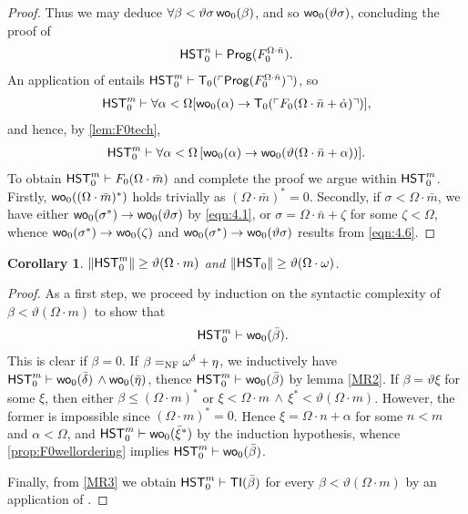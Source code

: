 \documentclass[UKenglish,cleveref,DIV=12]{scrartcl}
\newtheorem{corollary}[lemma]{Corollary}
\theoremstyle{definition}
\theoremstyle{definition}
\begin{document}
\begin{proof}
Thus we may deduce $\forall\beta<\vartheta\sigma\,\mathsf{wo}_0(\beta)$, 
 and so $\mathsf{wo}_0(\vartheta\sigma)$, concluding the proof of
\begin{align}\label{eqn:4.2}
  \mathsf{HST}_0^n\vdash\mathsf{Prog} (F^{\Omega\cdot\bar n}_0).
\end{align}
An application of  entails $\mathsf{HST}_0^m\vdash \mathsf{T}_0(\ulcorner{\mathsf{Prog}( F^{\Omega\cdot\bar n}_0)}\urcorner)$, so
\begin{align*}
  \mathsf{HST}_0^m\vdash\forall\alpha<\Omega[\mathsf{wo}_0(\alpha)\rightarrow
   \mathsf{T}_0(\ulcorner{F_0(\Omega\cdot\bar n+\dot\alpha)}\urcorner)],
\end{align*}
and hence, by \cref{lem:F0tech},
\begin{align}\label{eqn:4.6}
  \mathsf{HST}_0^m\vdash\forall\alpha<\Omega\,[\mathsf{wo}_0(\alpha)\rightarrow\mathsf{wo}_0(\vartheta(\Omega\cdot\bar
  n+\alpha))].
\end{align}
To obtain $\mathsf{HST}_0^m\vdash F_0(\Omega\cdot\bar m)$ and complete the proof we
argue within $\mathsf{HST}_0^m$. Firstly, $\mathsf{wo}_0((\Omega\cdot\bar m)^*)$ holds trivially as $(\Omega\cdot\bar m)^*=0$. Secondly, if
$\sigma<\Omega\cdot\bar m$, we have either $\mathsf{wo}_0(\sigma^*)\rightarrow
\mathsf{wo}_0(\vartheta\sigma)$ by \eqref{eqn:4.1}, or $\sigma=\Omega\cdot\bar
n+\zeta$ for some $\zeta<\Omega$, whence $\mathsf{wo}_0(\sigma^*)\rightarrow \mathsf{wo}_0(\zeta)$
and $\mathsf{wo}_0(\sigma^*)\rightarrow \mathsf{wo}_0(\vartheta\sigma)$ results from
\eqref{eqn:4.6}.
\end{proof}
\begin{corollary}\label{cor:F0lowerbound}
 $\lVert{\mathsf{HST}_0^m}\rVert\ge\vartheta(\Omega\cdot m)$ and $\lVert{\mathsf{HST}_0}\rVert\ge\vartheta(\Omega\cdot\omega)$.
\end{corollary}
\begin{proof}
 As a first step, we proceed by induction on the syntactic complexity of $\beta<\vartheta(\Omega\cdot m)$ to show that 
 \begin{eqnarray}\label{MR3} &&\mathsf{HST}_0^m\vdash \mathsf{wo}_0(\bar\beta).\end{eqnarray}
  This is clear if $\beta=0$.  If $\beta=_{\mathrm{NF}}\omega^\delta+\eta$, we inductively have  $\mathsf{HST}_0^m\vdash \mathsf{wo}_0(\bar\delta)\,\wedge\mathsf{wo}_0(\bar\eta)$,
 thence  $\mathsf{HST}_0^m\vdash \mathsf{wo}_0(\bar\beta)$ by lemma \ref{MR2}.
 If $\beta=\vartheta \xi$ for some $\xi$, then either $\beta\leq (\Omega\cdot m)^*$ or $\xi<\Omega\cdot m\,\wedge\,\xi^*<\vartheta(\Omega\cdot m)$. However, the former is impossible since
 $ (\Omega\cdot m)^*=0$. Hence $\xi=\Omega\cdot n+\alpha$ for some $n<m$ and $\alpha<\Omega$, and
$\mathsf{HST}_0^m\vdash\mathsf{wo}_0(\bar\xi^*)$ by the induction hypothesis, whence
\cref{prop:F0wellordering} implies $\mathsf{HST}_0^m\vdash\mathsf{wo}_0(\bar\beta)$.

Finally, from \eqref{MR3} we obtain $\mathsf{HST}_0^m\vdash\mathsf{TI}(\bar\beta)$  for every $\beta<\vartheta(\Omega\cdot m)$ by an application of
.
\end{proof}
\end{document}
